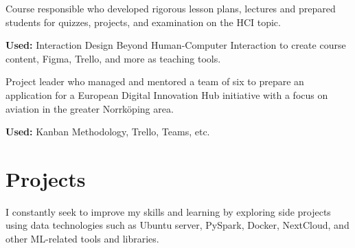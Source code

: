 \documentclass[a4paper]{plushcv}
\begin{document}
\begin{minipage}[t]{0.69\textwidth}
\begin{tightemize}
	\item Course responsible who developed rigorous lesson plans, lectures and prepared students for quizzes, projects, and examination on the HCI topic. 
	
	\item \textbf{Used:} Interaction Design Beyond Human-Computer Interaction to create course content, Figma, Trello, and more as teaching tools.\sectionsep
	
\end{tightemize}
\sectionsep
\sectionsep

\begin{tightemize}
\sectionsep

	\item Project leader who managed and mentored a team of six to prepare an application for a European Digital Innovation Hub initiative with a focus on aviation in the greater Norrk\"oping area.
		
	\item \textbf{Used:} Kanban Methodology, Trello, Teams, etc.\sectionsep
	
\end{tightemize}



\section{Projects}


\begin{tightemize}
\item I constantly seek to improve my skills and learning by exploring side projects using data technologies such as Ubuntu server, PySpark, Docker, NextCloud, and other ML-related tools and libraries.
\end{tightemize}




%
%

\end{minipage} 
\end{document}

